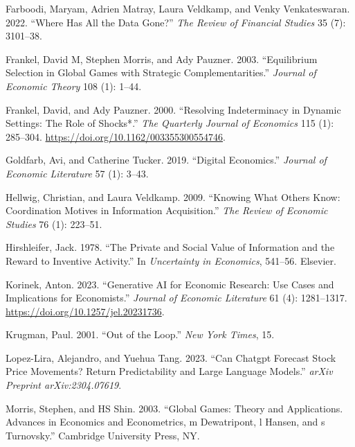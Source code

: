 \documentclass[
]{article}
\newlength{\cslhangindent}
\newlength{\cslentryspacingunit} %
\newenvironment{CSLReferences}[2] %
 {%
  \setlength{\parindent}{0pt}
  \ifodd #1
  \let\oldpar\par
  \def\par{\hangindent=\cslhangindent\oldpar}
  \fi
  \setlength{\parskip}{#2\cslentryspacingunit}
 }%
 {}
\theoremstyle{plain}
\theoremstyle{remark}
\begin{document}
\begin{CSLReferences}{1}{0}
\leavevmode{}%
Farboodi, Maryam, Adrien Matray, Laura Veldkamp, and Venky
Venkateswaran. 2022. {``Where Has All the Data Gone?''} \emph{The Review
of Financial Studies} 35 (7): 3101--38.

\leavevmode{}%
Frankel, David M, Stephen Morris, and Ady Pauzner. 2003. {``Equilibrium
Selection in Global Games with Strategic Complementarities.''}
\emph{Journal of Economic Theory} 108 (1): 1--44.

\leavevmode{}%
Frankel, David, and Ady Pauzner. 2000. {``{Resolving Indeterminacy in
Dynamic Settings: The Role of Shocks*}.''} \emph{The Quarterly Journal
of Economics} 115 (1): 285--304.
\url{https://doi.org/10.1162/003355300554746}.

\leavevmode{}%
Goldfarb, Avi, and Catherine Tucker. 2019. {``Digital Economics.''}
\emph{Journal of Economic Literature} 57 (1): 3--43.

\leavevmode{}%
Hellwig, Christian, and Laura Veldkamp. 2009. {``Knowing What Others
Know: Coordination Motives in Information Acquisition.''} \emph{The
Review of Economic Studies} 76 (1): 223--51.

\leavevmode{}%
Hirshleifer, Jack. 1978. {``The Private and Social Value of Information
and the Reward to Inventive Activity.''} In \emph{Uncertainty in
Economics}, 541--56. Elsevier.

\leavevmode{}%
Korinek, Anton. 2023. {``Generative AI for Economic Research: Use Cases
and Implications for Economists.''} \emph{Journal of Economic
Literature} 61 (4): 1281--1317.
\url{https://doi.org/10.1257/jel.20231736}.

\leavevmode{}%
Krugman, Paul. 2001. {``Out of the Loop.''} \emph{New York Times}, 15.

\leavevmode{}%
Lopez-Lira, Alejandro, and Yuehua Tang. 2023. {``Can Chatgpt Forecast
Stock Price Movements? Return Predictability and Large Language
Models.''} \emph{arXiv Preprint arXiv:2304.07619}.

\leavevmode{}%
Morris, Stephen, and HS Shin. 2003. {``Global Games: Theory and
Applications. Advances in Economics and Econometrics, m Dewatripont, l
Hansen, and s Turnovsky.''} Cambridge University Press, NY.


\end{CSLReferences}
\end{document}
